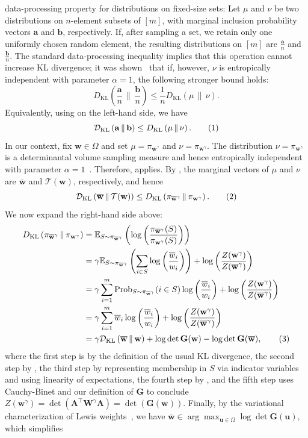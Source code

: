 \documentclass[11pt]{article}
\newcommand\numberthis{\addtocounter{equation}{1}\tag{\theequation}}
\theoremstyle{plain}
\numberwithin{equation}{section}
\newcommand{\Prob}{\operatorname{Prob}}
\newcommand{\E}{\mathbb{E}}
\newcommand{\bA}{\mathbf{A}}
\newcommand{\bG}{\mathbf{G}}
\newcommand{\bW}{\mathbf{W}}
\newcommand{\ba}{\mathbf{a}}
\newcommand{\bb}{\mathbf{b}}
\newcommand{\bw}{\mathbf{w}}
\newcommand{\bu}{\mathbf{u}}
\newcommand{\bwbar}{\overline{\mathbf{w}}}
\newcommand{\wbar}{\overline{w}}
\newcommand{\calT}{\mathcal{T}}
\newcommand{\omrp}{\gamma}
\newcommand{\kldiv}[2]{\mathcal{D}_{\mathrm{KL}}\left(#1 \,\|\, #2\right)}
\newcommand{\KL}[2]{D_{\mathrm{KL}}\left(#1 \,\|\, #2\right)}
\begin{document}
data-processing property for distributions on fixed-size sets: Let $\mu$ and $\nu$ be two distributions on $n$-element subsets of $[m]$, with marginal inclusion probability vectors $\ba$ and $\bb$, respectively. If, after sampling a set, we retain only one uniformly chosen random element, the resulting distributions on $[m]$ 
are $\frac{\ba}{n}$ and $\frac{\bb}{n}$. The standard data-processing inequality  implies that this operation cannot increase KL divergence; it was shown~\cite{anari2022entropic} that if, however, $\nu$ is entropically independent with parameter $\alpha=1$, the following stronger bound holds: 
\[ 
\KL{\frac{\ba}{n}}{\frac{\bb}{n}} \leq \frac{1}{n}\KL{\mu}{\nu}. 
\]
 Equivalently, using
 on the left-hand side, we have
\[
\kldiv{\ba}{\bb}\leq \KL{\mu}{\nu}.
\numberthis\label{eq:EI-con-1}
\]In our context, fix $\bw\in\Omega$ and set
$\mu=\pi_{\bwbar^\omrp}$ and $\nu=\pi_{\bw^\omrp}$.
The distribution $\nu=\pi_{\bw^\omrp}$ is a determinantal volume sampling measure and hence  entropically independent with parameter $\alpha=1$~\cite{anari2022entropic,anari2025optimal}.
Therefore,  applies.
By , the marginal vectors of $\mu$ and $\nu$ are $\bwbar$ and $\calT(\bw)$, respectively, and hence
\[
\kldiv{\bwbar}{\calT(\bw)}
\leq
\KL{\pi_{\bwbar^\omrp}}{\pi_{\bw^\omrp}}.
\numberthis\label{eq:EI-con-2}
\] We now expand the right-hand side above: \begin{align*}\KL{\pi_{\bwbar^\omrp}}{\pi_{\bw^\omrp}} &=  \E_{S\sim \pi_{\bwbar^\omrp}}\left(\log\left(\frac{\pi_{\bwbar^\omrp}(S)}{\pi_{\bw^\omrp}(S)}\right)\right)  \\  
&= \omrp\E_{S\sim \pi_{\bwbar^\omrp}} \left( \sum_{i \in S}\log\left(\frac{\wbar_i}{w_i}\right)\right)  + \log\left(\frac{Z(\bw^\omrp)}{Z(\bwbar^\omrp)}\right) \\ 
&= \omrp\sum_{i=1}^m \Prob_{S\sim \pi_{\bwbar^\omrp}}(i\in S) \log\left(\frac{\wbar_i}{w_i}\right) + \log\left(\frac{Z(\bw^\omrp)}{Z(\bwbar^\omrp)}\right) \\ 
&= \gamma\sum_{i=1}^m \wbar_i \log\left(\frac{\wbar_i}{w_i}\right) + \log\left(\frac{Z(\bw^\omrp)}{Z(\bwbar^\omrp)}\right) \\
&= \gamma \kldiv{\bwbar}{\bw} +\log\det\bG(\bw)-\log\det\bG(\bwbar),\numberthis\label{eq:EI-con-3}
\end{align*} where the first step is by the definition of the usual KL divergence, the second step by , the third step by representing membership in $S$ via  indicator variables and using linearity of expectations, the fourth step by , and the fifth step uses Cauchy-Binet  and our definition of $\bG$ to conclude $Z(\bw^\omrp) = \det\left(\bA^\top\bW^\omrp\bA\right)=\det(\bG(\bw))$. Finally, by the variational characterization of Lewis weights~\cite{cohen2015lp,lee2019solving}, we have $\bwbar\in\arg\max_{\bu\in\Omega}\log\det\bG(\bu),$ which simplifies 
\end{document}
